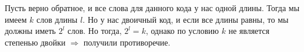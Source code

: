\documentclass[../main.tex]{subfiles}
\begin{document}
Пусть верно обратное, и все слова для данного кода у нас одной длины. Тогда мы имеем $k$ слов \newline длины $l$. Но у нас двоичный код, и если все длины равны, то мы должны иметь $2^l$ слов. Но тогда, $2^l=k$, однако по условию $k$ не является степенью двойки $\Rightarrow$ получили противоречие.
\end{document}
